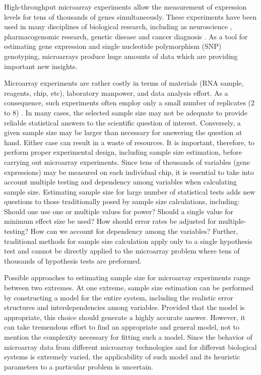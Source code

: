 \documentclass[12pt]{article}
\begin{document}
High-throughput microarray experiments allow the measurement of
expression levels for tens of thousands of genes simultaneously.
These experiments have been used in many disciplines of biological
research, including as neuroscience \citep{Mandel03},
pharmacogenomic research, genetic disease and cancer diagnosis
\citep{Heller02}.  As a tool for estimating gene expression and
single nucleotide polymorphism (SNP) genotyping, microarrays produce
huge amounts of data which are providing important new insights.

Microarray experiments are rather costly in terms of materials
(RNA sample, reagents, chip, etc), laboratory manpower, and data
analysis effort.  As a consequence, such experiments often employ
only a small number of replicates (2 to 8) \citep{Speed03}. In
many cases, the selected sample size may not be adequate to
provide reliable statistical answers to the scientific question of
interest. Conversely, a given sample size may be larger than
necessary for answering the question at hand. Either case can
result in a waste of resources. It is important, therefore, to
perform proper experimental design, including sample size
estimation, before carrying out microarray experiments. Since tens
of thousands of variables (gene expressions) may be measured on
each individual chip, it is essential to take into account
multiple testing and dependency among variables when calculating
sample size. Estimating sample size for large number of
statistical tests adds new questions to those traditionally posed
by sample size calculations, including: Should one use one or
multiple values for power? Should a single value for minimum
effect size be used?  How should error rates be adjusted for
multiple-testing?  How can we account for dependency among the
variables?  Further, traditional methods for sample size
calculation apply only to a single hypothesis test and cannot be
directly applied to the microarray problem where tens of thousands
of hypothesis tests are preformed.

Possible approaches to estimating sample size for microarray
experiments range between two extremes. At one extreme, sample
size estimation can be performed by constructing a model for the
entire system, including the realistic error structures and
interdependencies among variables. Provided that the model is
appropriate, this choice should generate a highly accurate answer.
However, it can take tremendous effort to find an appropriate and
general model, not to mention the complexity necessary for fitting
such a model.  Since the behavior of microarray data from
different microarray technologies and for different biological
systems is extremely varied, the applicability of such model and
its heuristic parameters to a particular problem is uncertain.
\end{document}
